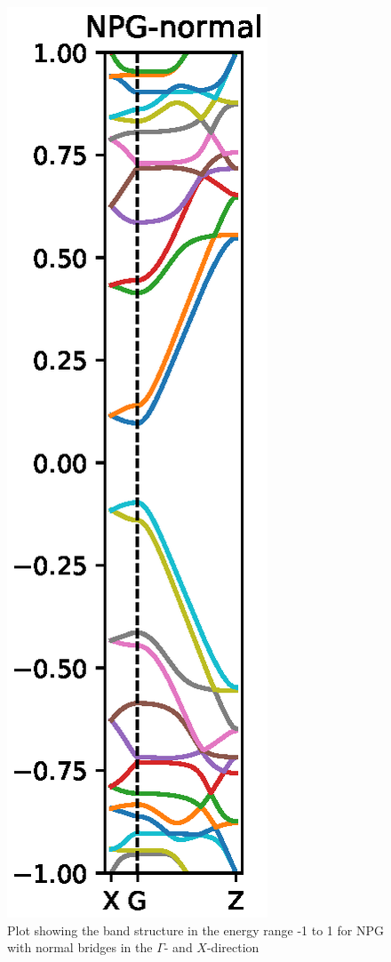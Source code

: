 \begin{figure}[H]
    \centering
    \includegraphics{Figures/name/FabNPGBS.eps}
    \caption{Plot showing the band structure in the energy range -1 to 1 for NPG with normal bridges in the \(\Gamma\)- and \(X\)-direction}
    \label{Fab}
\end{figure}


